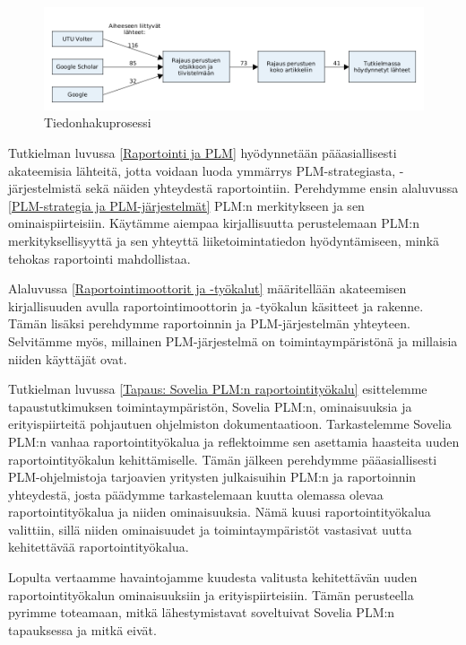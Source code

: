 \begin{figure}[tbh]
\includegraphics[width=1\textwidth]{img/lahteet.png}
\caption{Tiedonhakuprosessi\label{fig:Lahteet}}
\end{figure}

Tutkielman luvussa \ref{Raportointi ja PLM} hyödynnetään pääasiallisesti akateemisia lähteitä, jotta voidaan luoda ymmärrys PLM-strategiasta, -järjestelmistä sekä näiden yhteydestä raportointiin. Perehdymme ensin alaluvussa \ref{PLM-strategia ja PLM-järjestelmät} PLM:n merkitykseen ja sen ominaispiirteisiin. Käytämme aiempaa kirjallisuutta perustelemaan PLM:n merkityksellisyyttä ja sen yhteyttä liiketoimintatiedon hyödyntämiseen, minkä tehokas raportointi mahdollistaa.

Alaluvussa \ref{Raportointimoottorit ja -työkalut} määritellään akateemisen kirjallisuuden avulla raportointimoottorin ja -työkalun käsitteet ja rakenne. Tämän lisäksi perehdymme raportoinnin ja PLM-järjestelmän yhteyteen. Selvitämme myös, millainen PLM-järjestelmä on toimintaympäristönä ja millaisia niiden käyttäjät ovat.

Tutkielman luvussa \ref{Tapaus: Sovelia PLM:n raportointityökalu} esittelemme tapaustutkimuksen toimintaympäristön, Sovelia PLM:n, ominaisuuksia ja erityispiirteitä pohjautuen ohjelmiston dokumentaatioon. Tarkastelemme Sovelia PLM:n vanhaa raportointityökalua ja reflektoimme sen asettamia haasteita uuden raportointityökalun kehittämiselle. Tämän jälkeen perehdymme pääasiallisesti PLM-ohjelmistoja tarjoavien yritysten julkaisuihin PLM:n ja raportoinnin yhteydestä, josta päädymme tarkastelemaan kuutta olemassa olevaa raportointityökalua ja niiden ominaisuuksia. Nämä kuusi raportointityökalua valittiin, sillä niiden ominaisuudet ja toimintaympäristöt vastasivat uutta kehitettävää raportointityökalua.

Lopulta vertaamme havaintojamme kuudesta valitusta kehitettävän uuden raportointityökalun ominaisuuksiin ja erityispiirteisiin. Tämän perusteella pyrimme toteamaan, mitkä lähestymistavat soveltuivat Sovelia PLM:n tapauksessa ja mitkä eivät.

